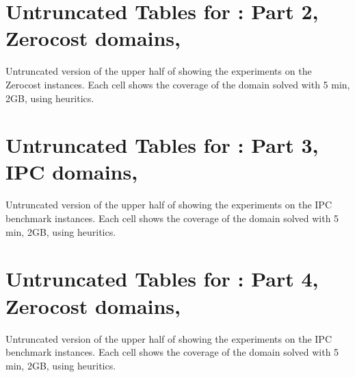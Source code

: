 \documentclass[10pt,letterpaper]{article}
\begin{document}
\newpage
\section{Untruncated Tables for  : Part 2, Zerocost domains, \lmcut}

\begin{table}[htb]
 {
 \centering
 
 \caption{
 Untruncated version of the upper half of  showing 
 the experiments on the Zerocost instances.
 Each cell shows the coverage of the domain solved with 5 min, 2GB,
 using \lmcut heuritics.
 }
 \label{lmcut-zerocost-full}
 }
\end{table}

\newpage
\section{Untruncated Tables for  : Part 3, IPC domains, \mands}

\begin{table}[htb]
 {
 \centering
 
 \caption{
 Untruncated version of the upper half of  showing 
 the experiments on the IPC benchmark instances.
 Each cell shows the coverage of the domain solved with 5 min, 2GB,
 using \mands heuritics.
 }
 \label{mands-ipc-full}
 }
\end{table}

\newpage
\section{Untruncated Tables for  : Part 4, Zerocost domains, \mands}

\begin{table}[htb]
 {
 \centering
 
 \caption{
 Untruncated version of the upper half of  showing 
 the experiments on the IPC benchmark instances.
 Each cell shows the coverage of the domain solved with 5 min, 2GB,
 using \mands heuritics.
 }
 \label{mands-zerocost-full}
 }
\end{table}
\end{document}
